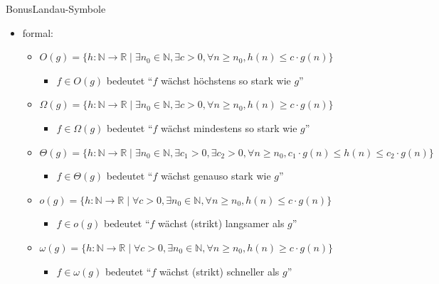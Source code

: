 \begin{frame}[allowframebreaks]{Bonus}{\vspace{0.5cm}Landau-Symbole}
  \begin{itemize}
    \item \alert{formal:} 
    \begin{itemize}
      \item $O(g)= \{h: \mathbb{N}\to\mathbb{R} \;|\; \exists n_0\in\mathbb{N}, \exists c > 0, \forall n\ge n_0, h(n)\le c \cdot g(n)\}$
        \begin{itemize}
          \item $f\in O(g)$ bedeutet \enquote{$f$ wächst \alert{höchstens} so stark wie $g$} 
        \end{itemize}
      \item $\Omega(g)= \{h: \mathbb{N}\to\mathbb{R} \;|\; \exists n_0\in\mathbb{N}, \exists c > 0, \forall n\ge n_0, h(n)\ge c \cdot g(n)\}$
        \begin{itemize}
          \item $f\in \Omega(g)$ bedeutet \enquote{$f$ wächst \alert{mindestens} so stark wie $g$} 
        \end{itemize}
      \item $\Theta(g)= \{h: \mathbb{N}\to\mathbb{R} \;|\; \exists n_0\in\mathbb{N}, \exists c_1 > 0, \exists c_2 > 0, \forall n\ge n_0, c_1 \cdot g(n) \le h(n)\le c_2 \cdot g(n)\}$
        \begin{itemize}
          \item $f\in \Theta(g)$ bedeutet \enquote{$f$ wächst \alert{genauso} stark wie $g$} 
        \end{itemize}
      \item $o(g)= \{h: \mathbb{N}\to\mathbb{R} \;|\; \forall c > 0, \exists n_0\in\mathbb{N}, \forall n\ge n_0, h(n)\le c \cdot g(n)\}$
        \begin{itemize}
          \item $f\in o(g)$ bedeutet \enquote{$f$ wächst \alert{(strikt) langsamer} als $g$} 
        \end{itemize}
      \item $\omega(g)= \{h: \mathbb{N}\to\mathbb{R} \;|\; \forall c > 0, \exists n_0\in\mathbb{N}, \forall n\ge n_0, h(n)\ge c \cdot g(n)\}$
        \begin{itemize}
          \item $f\in \omega(g)$ bedeutet \enquote{$f$ wächst \alert{(strikt) schneller} als $g$} 
        \end{itemize}
    \end{itemize}

\end{itemize}
\end{frame}
